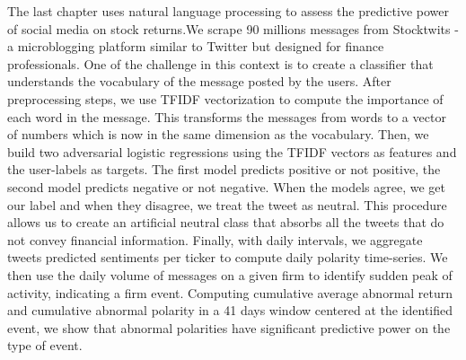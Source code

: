 The last chapter uses natural language processing to assess the predictive power of social media on stock returns.We scrape 90 millions messages from Stocktwits - a microblogging platform similar to Twitter but designed for finance professionals. One of the challenge in this context is to create a classifier that understands the vocabulary of the message posted by the users. After preprocessing steps, we use TFIDF vectorization to compute the importance of each word in the message. This transforms the messages from words to a vector of numbers which is now in the same dimension as the vocabulary. Then, we build two adversarial logistic regressions using the TFIDF vectors as features and the user-labels as targets. The first model predicts positive or not positive, the second model predicts negative or not negative. When the models agree, we get our label and when they disagree, we treat the tweet as neutral. This procedure allows us to create an artificial neutral class that absorbs all the tweets that do not convey financial information. Finally, with daily intervals, we aggregate tweets predicted sentiments per ticker to compute daily polarity time-series. We then use the daily volume of messages on a given firm to identify sudden peak of activity, indicating a firm event. Computing cumulative average abnormal return and cumulative abnormal polarity in a 41 days window centered at the identified event, we show that abnormal polarities have significant predictive power on the type of event.



